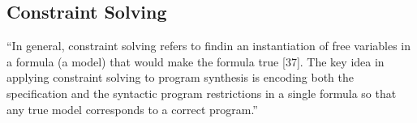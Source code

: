 \subsection{Constraint Solving}
\label{sec:constraint-solving}

``In general, constraint solving refers to findin an instantiation of free
variables in a formula (a model) that would make the formula true [37]. The key
idea in applying constraint solving to program synthesis is encoding both the
specification and the syntactic program restrictions in a single formula so
that any true model corresponds to a correct program.''

